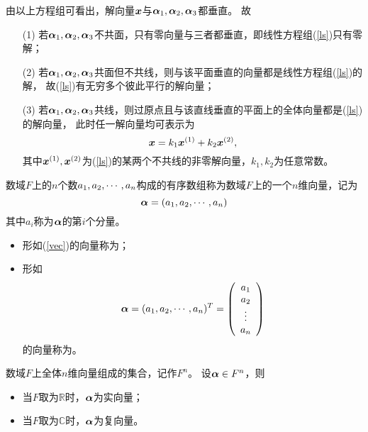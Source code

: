 \begin{frame}
由以上方程组可看出，解向量${\boldsymbol{x}}$与$\boldsymbol{\alpha}_1,\boldsymbol{\alpha}_2,\boldsymbol{\alpha}_3$都垂直。 故
\begin{itemize}
\item[(1)] 若$\boldsymbol{\alpha}_1,\boldsymbol{\alpha}_2,\boldsymbol{\alpha}_3$不共面，只有零向量与三者都垂直，即线性方程组(\ref{ls})只有零解；
\item[(2)] 若$\boldsymbol{\alpha}_1,\boldsymbol{\alpha}_2,\boldsymbol{\alpha}_3$共面但不共线，则与该平面垂直的向量都是线性方程组(\ref{ls})的解，
  故(\ref{ls})有无穷多个彼此平行的解向量；
\item[(3)] 若$\boldsymbol{\alpha}_1,\boldsymbol{\alpha}_2,\boldsymbol{\alpha}_3$共线，则过原点且与该直线垂直的平面上的全体向量都是(\ref{ls})的解向量，
  此时任一解向量均可表示为
  $$
  {\boldsymbol{x}} = k_1 {\boldsymbol{x}}^{(1)} + k_2 {\boldsymbol{x}}^{(2)},
  $$
  其中${\boldsymbol{x}}^{(1)}, {\boldsymbol{x}}^{(2)}$为(\ref{ls})的某两个不共线的非零解向量，$k_1,k_2$为任意常数。
\end{itemize}
\end{frame}

\begin{frame}
\begin{dingyi}[$n$维向量]
  数域$F$上的$n$个数$a_1,a_2,\cdots,a_n$构成的有序数组称为数域$F$上的一个$n$维向量，记为
  \begin{equation}\label{vec}
    \boldsymbol{\alpha} = (a_1, a_2, \cdots, a_n)
  \end{equation}
  其中$a_i$称为$\boldsymbol{\alpha}$的第$i$个分量。
\end{dingyi}
\end{frame}

\begin{frame}
\begin{itemize}
\item 形如(\ref{vec})的向量称为；
\item 形如
  $$
  \boldsymbol{\alpha} = (a_1, a_2, \cdots, a_n)^T = \left(
  \begin{array}{c}
    a_1\\
    a_2\\
    \vdots\\
    a_n
  \end{array}
  \right)
  $$
  的向量称为。
\end{itemize}
数域$F$上全体$n$维向量组成的集合，记作$F^n$。 设$\boldsymbol{\alpha}\in F^n$，则
\begin{itemize}
\item 当$F$取为$\mathbb R$时，$\boldsymbol{\alpha}$为实向量；
\item 当$F$取为$\mathbb C$时，$\boldsymbol{\alpha}$为复向量。
\end{itemize}
\end{frame}

